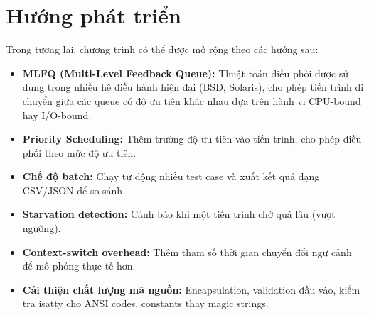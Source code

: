 \section{Hướng phát triển}

Trong tương lai, chương trình có thể được mở rộng theo các hướng sau:

\begin{itemize}
    \item \textbf{MLFQ (Multi-Level Feedback Queue):} Thuật toán điều phối được sử dụng trong nhiều hệ điều hành hiện đại (BSD, Solaris), cho phép tiến trình di chuyển giữa các queue có độ ưu tiên khác nhau dựa trên hành vi CPU-bound hay I/O-bound.
    \item \textbf{Priority Scheduling:} Thêm trường độ ưu tiên vào tiến trình, cho phép điều phối theo mức độ ưu tiên.
    \item \textbf{Chế độ batch:} Chạy tự động nhiều test case và xuất kết quả dạng CSV/JSON để so sánh.
    \item \textbf{Starvation detection:} Cảnh báo khi một tiến trình chờ quá lâu (vượt ngưỡng).
    \item \textbf{Context-switch overhead:} Thêm tham số thời gian chuyển đổi ngữ cảnh để mô phỏng thực tế hơn.
    \item \textbf{Cải thiện chất lượng mã nguồn:} Encapsulation, validation đầu vào, kiểm tra isatty cho ANSI codes, constants thay magic strings.
\end{itemize}
